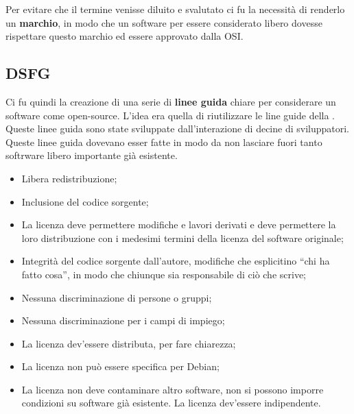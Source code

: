 Per evitare che il termine venisse diluito e svalutato ci fu la necessità di renderlo un \textbf{marchio}, in modo che un software per essere considerato libero dovesse rispettare questo marchio ed essere approvato dalla OSI. 

\subsection{DSFG}

Ci fu quindi la creazione di una serie di \textbf{linee guida} chiare per considerare un software come open-source. L'idea era quella di riutilizzare le line guide della . Queste linee guida sono state sviluppate dall'interazione di decine di sviluppatori. Queste linee guida dovevano esser fatte in modo da non lasciare fuori tanto softrware libero importante già esistente.

\begin{itemize}

\item Libera redistribuzione;
\item Inclusione del codice sorgente;
\item La licenza deve permettere modifiche e lavori derivati e deve permettere la loro distribuzione con i medesimi termini della licenza del software originale;
\item Integrità del codice sorgente dall'autore, modifiche che esplicitino ``chi ha fatto cosa'', in modo che chiunque sia responsabile di ciò che scrive;
\item Nessuna discriminazione di persone o gruppi;
\item Nessuna discriminazione per i campi di impiego;
\item La licenza dev'essere distributa, per fare chiarezza;
\item La licenza non può essere specifica per Debian;
\item La licenza non deve contaminare altro software, non si possono imporre condizioni su software già esistente. La licenza dev'essere indipendente.

\end{itemize}

